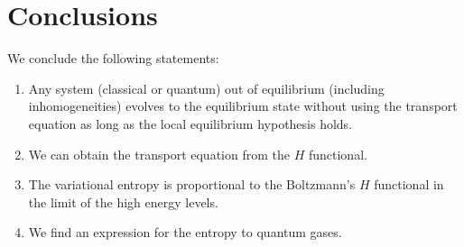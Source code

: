 
\section{Conclusions}
We conclude the following statements:\\
\begin{enumerate}
    \item Any system (classical or quantum) out of equilibrium (including inhomogeneities) evolves to the equilibrium state without using the transport equation as long as the local equilibrium hypothesis holds.
    \item We can obtain the transport equation from the $H$ functional.
    \item The variational entropy is proportional to the Boltzmann's $H$ functional in the limit of the high energy levels.
    \item We find an expression for the entropy to quantum gases.
    \end{enumerate}
  
  
\clearpage



